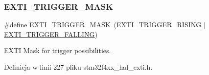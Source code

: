\subsubsection{\texorpdfstring{E\+X\+T\+I\+\_\+\+T\+R\+I\+G\+G\+E\+R\+\_\+\+M\+A\+SK}{EXTI\_TRIGGER\_MASK}}
{\footnotesize\ttfamily \#define E\+X\+T\+I\+\_\+\+T\+R\+I\+G\+G\+E\+R\+\_\+\+M\+A\+SK~(\hyperlink{group___e_x_t_i___trigger_ga648bd5d6c2bebd85b5ea85f8af9a2ccc}{E\+X\+T\+I\+\_\+\+T\+R\+I\+G\+G\+E\+R\+\_\+\+R\+I\+S\+I\+NG} $\vert$ \hyperlink{group___e_x_t_i___trigger_ga7461c33165994159edf79a095c227937}{E\+X\+T\+I\+\_\+\+T\+R\+I\+G\+G\+E\+R\+\_\+\+F\+A\+L\+L\+I\+NG})}



E\+X\+TI Mask for trigger possibilities. 



Definicja w linii 227 pliku stm32f4xx\+\_\+hal\+\_\+exti.\+h.

